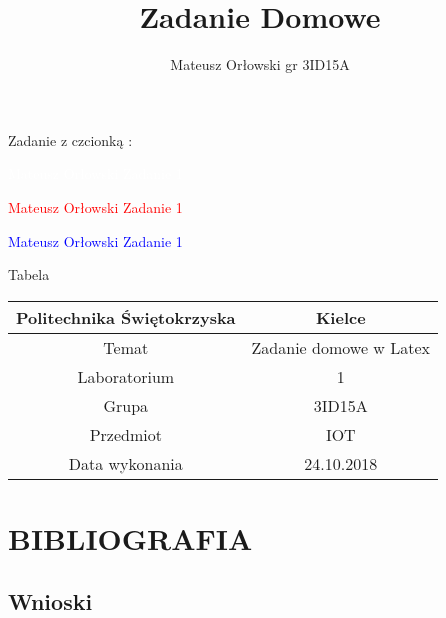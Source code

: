 \documentclass[15pt,a4paper]{article}
\title{Zadanie Domowe}
\author{Mateusz Orłowski gr 3ID15A}
\begin{document}
\maketitle


\begin{center}
{\huge Zadanie z czcionką  : \\}


\begin{HUGE}
\textcolor{white}{Mateusz Orłowski Zadanie 1}\\
\end{HUGE}


\begin{Large}
\textcolor{red}{Mateusz Orłowski Zadanie 1}\\
\end{Large}



\begin{huge}
\textcolor{blue}{Mateusz Orłowski Zadanie 1}\\
\end{huge}

\pagecolor{green}

{\Huge Tabela\\}
\begin{center}
\begin{tabular}{|c|c|} \hline
Politechnika Świętokrzyska & Kielce \\
\hline \hline
Temat & Zadanie domowe w Latex \\
\hline \hline
Laboratorium & 1 \\
\hline \hline
Grupa & 3ID15A \\
\hline \hline
Przedmiot & IOT \\ 
\hline \hline
Data wykonania & 24.10.2018 \\
\hline \hline
\end{tabular}
\end{center}
\section{BIBLIOGRAFIA}
\end{center}





\cite{abramowitz+stegun}



\newpage
\begin{center}
\section{Wnioski}
\end{center}
\end{document}
